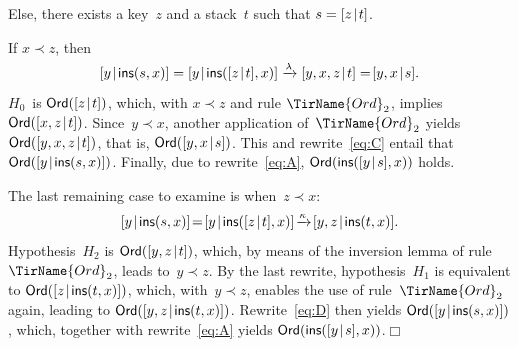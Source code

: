 \begin{itemize*}
\begin{itemize*}
\begin{itemize*}
          \item Else, there exists a key~\(z\) and a stack~\(t\) such
            that \(s = [{z}\!\mid\!{t}]\).
            \begin{itemize*}

              \item If \(x \prec z\), then
                \begin{equation}
                  \cons{y}{\fun{ins}(s,x)} =
                  \cons{y}{\fun{ins}(\cons{z}{t},x)}
                  \xrightarrow{\smash{\lambda}} \cons{y,x,z}{t} =\!
                  \cons{y,x}{s}.\label{eq:C}
                \end{equation}
                \(H_0\)~is \(\textsf{Ord}({[{z}\!\mid\!{t}]})\), which, with
                \(x \prec z\) and rule \(\TirName{Ord}_2\), implies
                \(\textsf{Ord}({[{x,z}\!\mid\!{t}]})\). Since~\(y \prec x\),
                another application of~\(\TirName{Ord}_2\) yields
                \(\textsf{Ord}({[{y,x,z}\!\mid\!{t}]})\), that is,
                \(\textsf{Ord}({[{y,x}\!\mid\!{s}]})\). This and
                rewrite~\eqref{eq:C} entail that
                \(\textsf{Ord}({[{y}\!\mid\!{\textsf{ins}(s,x)}]})\). Finally, due
                to rewrite~\eqref{eq:A},
                \(\textsf{Ord}({\textsf{ins}([{y}\!\mid\!{s}],x)})\) holds.

              \item The last remaining case to examine is when~\(z \prec x\):
                \begin{equation}
                  \cons{y}{\fun{ins}(s,x)} \!=\!
                  \cons{y}{\fun{ins}(\cons{z}{t},x)}
                  \!\xrightarrow{\smash{\kappa}}\!
                  \cons{y,z}{\fun{ins}(t,x)}.\label{eq:D}
                \end{equation}
                Hypothesis~\(H_2\) is \(\textsf{Ord}({[{y,z}\!\mid\!{t}]})\),
                which, by means of the inversion lemma of
                rule~\(\TirName{Ord}_2\), leads to~\(y \prec z\). By
                the last rewrite, hypothesis~\(H_1\) is equivalent to
                \(\textsf{Ord}({[{z}\!\mid\!{\textsf{ins}(t,x)}]})\), which,
                with~\(y \prec z\), enables the use of
                rule~\(\TirName{Ord}_2\) again, leading to
                \(\textsf{Ord}({[{y,z}\!\mid\!{\textsf{ins}(t,x)}]})\).
                Rewrite~\eqref{eq:D} then yields
                \(\textsf{Ord}({[{y}\!\mid\!{\textsf{ins}(s,x)}]})\), which,
                together with rewrite~\eqref{eq:A} yields
                \(\textsf{Ord}({\textsf{ins}([{y}\!\mid\!{s}],x)})\).\hfill\(\Box\)

      \end{itemize*}
    \end{itemize*}
  \end{itemize*}
\end{itemize*}

